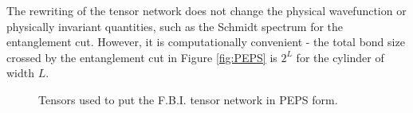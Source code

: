 The rewriting of the tensor network does not change the physical wavefunction or physically invariant quantities, such as the Schmidt spectrum for the entanglement cut. However, it is computationally convenient - the total bond size crossed by the entanglement cut in Figure \ref{fig:PEPS} is $2^L$ for the cylinder of width $L$.

\begin{figure}[H]
	\centering
	\quad
		
%
\caption{Tensors used to put the F.B.I. tensor network in PEPS form. }
\label{fig:FBI_PEPS_2}
\end{figure}

